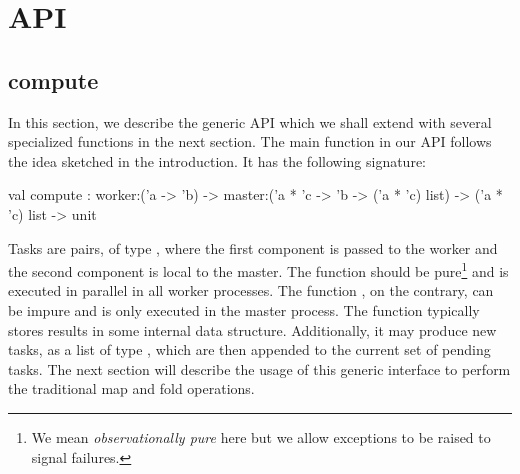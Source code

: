 \documentclass[tfpsymp,pagenumbers]{tfp07symp}
\begin{document}
\section{API}\label{sec:API}

\subsection{compute}

In this section, we describe the
generic API which we shall extend with several specialized
functions in the next section. The main function in our API follows the idea
sketched in the introduction. It has the following signature:
\begin{ocaml}
  val compute : 
    worker:('a -> 'b) -> 
    master:('a * 'c -> 'b -> ('a * 'c) list) -> 
    ('a * 'c) list -> unit
\end{ocaml}
Tasks are pairs, of type , where the first component is
passed to the worker and the second component is local to the master.
The  function should be pure\footnote{We mean
  \emph{observationally pure} here but we allow exceptions to be
  raised to signal failures.} 
and is executed in parallel
in all worker processes. The function , on the
contrary, can be impure and is only executed in the master process.
The  function typically stores results 
in some internal data structure.
Additionally, it may produce new tasks, as a list of type 
, which are then appended to the current set of
pending tasks.
The next section will describe the usage of this generic interface to
perform the traditional map and fold operations.
\end{document}
